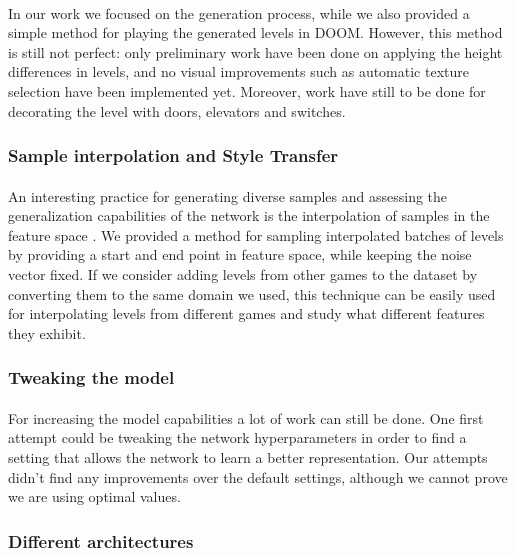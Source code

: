 \paragraph{} In our work we focused on the generation process, while we also provided a simple method for playing the generated levels in DOOM. However, this method is still not perfect: only preliminary work have been done on applying the height differences in levels, and no visual improvements such as automatic texture selection have been implemented yet. Moreover, work have still to be done for decorating the level with doors, elevators and switches. 

 \subsubsection{Sample interpolation and Style Transfer}
\paragraph{} An interesting practice for generating diverse samples and assessing the generalization capabilities of the network is the interpolation of samples in the feature space \cite{slerp}. We provided a method for sampling interpolated batches of levels by providing a start and end point in feature space, while keeping the noise vector fixed. If we consider adding levels from other games to the dataset by converting them to the same domain we used, this technique can be easily used for interpolating levels from different games and study what different features they exhibit.

\subsubsection{Tweaking the model}
\paragraph{} For increasing the model capabilities a lot of work can still be done. One first attempt could be tweaking the network hyperparameters in order to find a setting that allows the network to learn a better representation. Our attempts didn't find any improvements over the default settings, although we cannot prove we are using optimal values.

\subsubsection{Different architectures}
